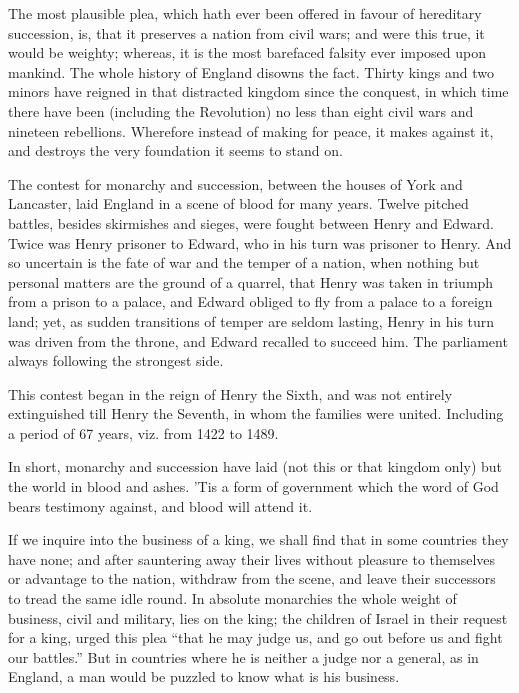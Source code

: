 \documentclass[12pt,oneside]{memoir}
\begin{document}
The most plausible plea, which hath ever been offered in favour of hereditary succession, is, that it preserves a nation from civil wars; and were this true, it would be weighty; whereas, it is the most barefaced falsity ever imposed upon mankind. The whole history of England disowns the fact. Thirty kings and two minors have reigned in that distracted kingdom since the conquest, in which time there have been (including the Revolution) no less than eight civil wars and nineteen rebellions. Wherefore instead of making for peace, it makes against it, and destroys the very foundation it seems to stand on.

The contest for monarchy and succession, between the houses of York and Lancaster, laid England in a scene of blood for many years. Twelve pitched battles, besides skirmishes and sieges, were fought between Henry and Edward. Twice was Henry prisoner to Edward, who in his turn was prisoner to Henry. And so uncertain is the fate of war and the temper of a nation, when nothing but personal matters are the ground of a quarrel, that Henry was taken in triumph from a prison to a palace, and Edward obliged to fly from a palace to a foreign land; yet, as sudden transitions of temper are seldom lasting, Henry in his turn was driven from the throne, and Edward recalled to succeed him. The parliament always following the strongest side.

This contest began in the reign of Henry the Sixth, and was not entirely extinguished till Henry the Seventh, in whom the families were united. Including a period of 67 years, viz. from 1422 to 1489.

In short, monarchy and succession have laid (not this or that kingdom only) but the world in blood and ashes. 'Tis a form of government which the word of God bears testimony against, and blood will attend it.

If we inquire into the business of a king, we shall find that in some countries they have none; and after sauntering away their lives without pleasure to themselves or advantage to the nation, withdraw from the scene, and leave their successors to tread the same idle round. In absolute monarchies the whole weight of business, civil and military, lies on the king; the children of Israel in their request for a king, urged this plea ``that he may judge us, and go out before us and fight our battles.'' But in countries where he is neither a judge nor a general, as in England, a man would be puzzled to know what is his business.
\end{document}
